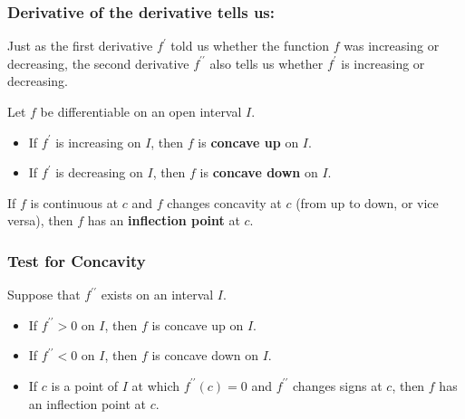 \documentclass[14pt]{beamer}
\begin{document}
\begin{frame}
\frametitle{\small Derivative of the derivative tells us:}
\small 
Just as the first derivative $f^{\prime}$ told us whether the function $f$ was increasing or decreasing, the second derivative $f^{\prime\prime}$ also tells us whether $f^{\prime}$ is increasing or decreasing.

\begin{dfn} Let $f$ be differentiable on an open interval $I$.
\begin{itemize}
\item If $f^{\prime}$ is increasing on $I$, then $f$ is {\bf concave up} on $I$.
\item If $f^{\prime}$ is decreasing on $I$, then $f$ is {\bf concave down} on $I$.
\end{itemize}
\end{dfn}

\begin{dfn} If $f$ is continuous at $c$ and $f$ changes concavity at $c$ (from up to down, or vice versa), then $f$ has an {\bf inflection point} at $c$. \end{dfn}
\end{frame}

\begin{frame}
\frametitle{\small Test for Concavity}
Suppose that $f^{\prime\prime}$ exists on an interval $I$.

\begin{itemize}
\item If $f^{\prime\prime}>0$ on $I$, then $f$ is \alert{concave up} on $I$.

\vspace{0.5pc}
\item If $f^{\prime\prime}<0$ on $I$, then $f$ is \alert{concave down} on $I$.

\vspace{0.5pc}
\item If $c$ is a point of $I$ at which $f^{\prime\prime}(c)=0$ and $f^{\prime\prime}$ changes signs at $c$, then $f$ has an \alert{inflection point} at $c$.
\end{itemize}
\end{frame}
\end{document}
